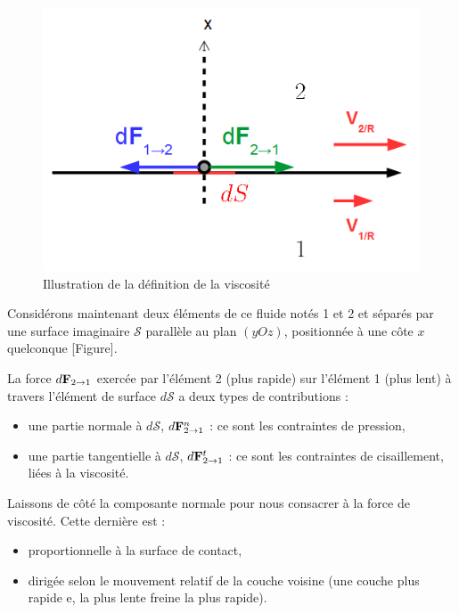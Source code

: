 \documentclass[11pt,a4paper]{report}
\begin{document}
\begin{figure}[h!]
\begin{center}
	\includegraphics[scale = 0.5]{viscosite_def4.png}
	\caption{Illustration de la définition de la viscosité} 
	\label{fig:transport_1Dmicromodel}
\end{center}
\end{figure}

Considérons maintenant deux éléments de ce fluide notés 1 et 2 et séparés par une surface imaginaire $\mathcal{S}$ parallèle au plan $(yOz)$, positionnée à une côte $x$ quelconque [Figure].

La force $d\bold{F}_{2\rightarrow 1}$ exercée par l'élément 2 (plus rapide) sur l'élément 1 (plus lent) à travers l'élément de surface $d\mathcal{S}$ a deux types de contributions :
\begin{itemize}
	\item une partie normale à $d\mathcal{S}$, $d\bold{F}_{2\rightarrow 1}^n$ : ce sont les contraintes de pression,
	\item une partie tangentielle à $d\mathcal{S}$, $d\bold{F}_{2\rightarrow 1}^t$ : ce sont les contraintes de cisaillement, liées à la viscosité.
\end{itemize}

Laissons de côté la composante normale pour nous consacrer à la force de viscosité. Cette dernière est :
\begin{itemize}
	\item proportionnelle à la surface de contact,
	\item dirigée selon le mouvement relatif de la couche voisine (une couche plus rapide e, la plus lente freine la plus rapide).
\end{itemize}
\end{document}
